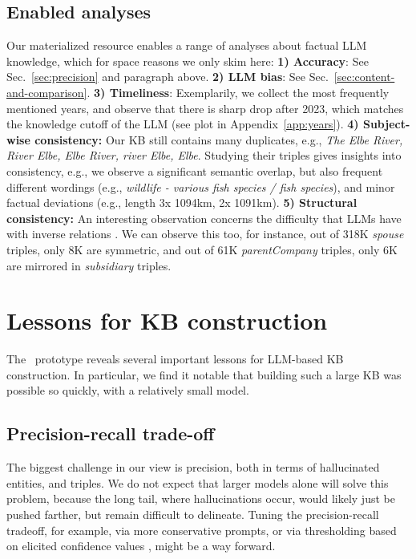 \subsection{Enabled analyses}
Our materialized resource enables a range of analyses about factual LLM knowledge, which for space reasons we only skim here:  \textbf{1) Accuracy}: See Sec.~\ref{sec:precision} and paragraph above. \textbf{2) LLM bias}: See Sec.~\ref{sec:content-and-comparison}. 
\textbf{3) Timeliness}: Exemplarily, we collect the most frequently mentioned years, and observe that there is sharp drop after 2023, which matches the knowledge cutoff of the LLM (see plot in Appendix~\ref{app:years}).
\textbf{4) Subject-wise consistency:} Our KB still contains many duplicates, e.g., \textit{The Elbe River, River Elbe, Elbe River, river Elbe, Elbe}. Studying their triples gives insights into consistency, e.g., we observe a significant semantic overlap, but also frequent different wordings (e.g., \textit{wildlife - various fish species / fish species}), and minor factual deviations (e.g., length 3x 1094km, 2x 1091km).
\textbf{5) Structural consistency:} An interesting observation concerns the difficulty that LLMs have with inverse relations \cite{reversalcurse}. We can observe this too, for instance, out of 318K \textit{spouse} triples, only 8K are symmetric, and out of 61K \textit{parentCompany} triples, only 6K are mirrored in \textit{subsidiary} triples.


\section{Lessons for KB construction}

The \ourkb\ prototype reveals several important lessons for LLM-based KB construction. In particular, we find it notable that building such a large KB was possible so quickly, with a relatively small model.

\subsection{Precision-recall trade-off} The biggest challenge in our view is precision, both in terms of hallucinated entities, and triples. We do not expect that larger models alone will solve this problem, because the long tail, where hallucinations occur, would likely just be pushed farther, but remain difficult to delineate. Tuning the precision-recall tradeoff, for example, via more conservative prompts, or via thresholding based on elicited confidence values \cite{xiongcan}, might be a way forward.

